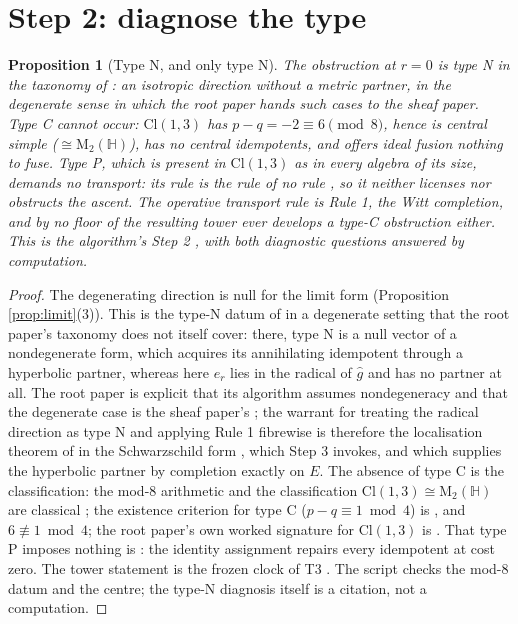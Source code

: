 \documentclass[11pt]{article}
\newtheorem{proposition}[theorem]{Proposition}
\theoremstyle{definition}
\newcommand{\Cl}{\mathrm{Cl}}
\newcommand{\HH}{\mathbb{H}}
\newcommand{\Mat}{\mathrm{M}}
\newcommand{\er}{e_r}
\begin{document}
\section{Step 2: diagnose the type}\label{sec:diagnose}

\begin{proposition}[Type N, and only type N]\label{prop:typeN}
The obstruction at $r = 0$ is type N in the taxonomy of \cite[\S 3]{ButlerT1}: an isotropic direction without a metric partner, in the degenerate sense in which the root paper hands such cases to the sheaf paper. Type C cannot occur: $\Cl(1,3)$ has $p - q = -2 \equiv 6 \pmod 8$, hence is central simple ($\cong \Mat_2(\HH)$), has no central idempotents, and offers ideal fusion nothing to fuse. Type P, which is present in $\Cl(1,3)$ as in every algebra of its size, demands no transport: its rule is the rule of no rule \cite[\S 6, Prop.~6.1]{ButlerT1}, so it neither licenses nor obstructs the ascent. The operative transport rule is Rule 1, the Witt completion, and by \cite[Thm.~3.6]{ButlerT3} no floor of the resulting tower ever develops a type-C obstruction either. This is the algorithm's Step 2 \cite[\S 8.1, Step 2]{ButlerT1}, with both diagnostic questions answered by computation.
\end{proposition}

\begin{proof}
The degenerating direction is null for the limit form (Proposition \ref{prop:limit}(3)). This is the type-N datum of \cite[Def.~3.1, Prop.~3.3]{ButlerT1} in a degenerate setting that the root paper's taxonomy does not itself cover: there, type N is a null vector of a nondegenerate form, which acquires its annihilating idempotent through a hyperbolic partner, whereas here $\er$ lies in the radical of $\hat g$ and has no partner at all. The root paper is explicit that its algorithm assumes nondegeneracy and that the degenerate case is the sheaf paper's \cite[Rem.~4.15, Rem.~8.4]{ButlerT1}; the warrant for treating the radical direction as type N and applying Rule 1 fibrewise is therefore the localisation theorem of \cite[Thm.~4.4, Cor.~4.5]{ButlerT4} in the Schwarzschild form \cite[Thms 8.7, 8.12]{ButlerT4}, which Step 3 invokes, and which supplies the hyperbolic partner by completion exactly on $E$. The absence of type C is the classification: the mod-8 arithmetic and the classification $\Cl(1,3) \cong \Mat_2(\HH)$ are classical \cite{Porteous1995}; the existence criterion for type C ($p - q \equiv 1 \bmod 4$) is \cite[Thm.~3.6]{ButlerT1}, and $6 \not\equiv 1 \bmod 4$; the root paper's own worked signature for $\Cl(1,3)$ is \cite[Ex.~3.12]{ButlerT1}. That type P imposes nothing is \cite[Prop.~6.1]{ButlerT1}: the identity assignment repairs every idempotent at cost zero. The tower statement is the frozen clock of T3 \cite{ButlerT3}. The script checks the mod-8 datum and the centre; the type-N diagnosis itself is a citation, not a computation.
\end{proof}
\end{document}
